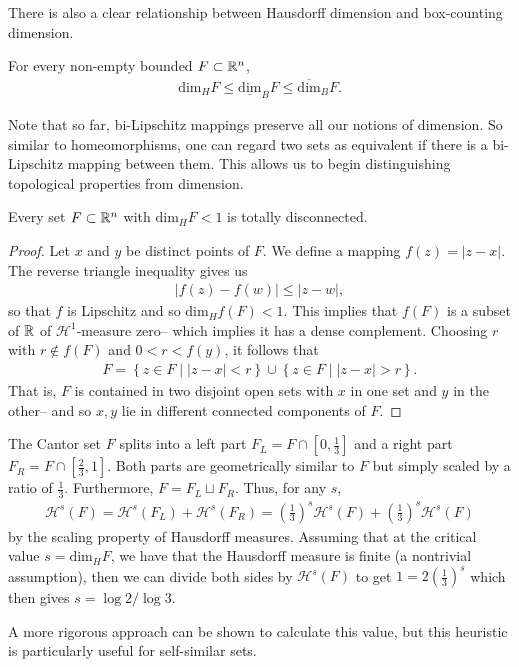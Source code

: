\documentclass{memoir}
\begin{document}
There is also a clear relationship between Hausdorff dimension and box-counting dimension.
\begin{prop}
	For every non-empty bounded \(F\subset \mathbb{R}^{n}\),
	\begin{align*}
		\textrm{dim}_H F \leq \underline{ \textrm{dim}}_B F \leq \overline{ \textrm{dim}}_B F.
	\end{align*}
\end{prop}
Note that so far, bi-Lipschitz mappings preserve all our notions of dimension. So similar to homeomorphisms, one can regard two sets as equivalent if there is a bi-Lipschitz mapping between them. This allows us to begin distinguishing topological properties from dimension.
\begin{prop}
	Every set \(F\subset \mathbb{R}^{n}\) with \( \textrm{dim}_H F < 1\) is totally disconnected.
\end{prop}
\begin{proof}
	Let \(x\) and \(y\) be distinct points of \(F\). We define a mapping \(f(z) = \left| z-x \right| \). The reverse triangle inequality gives us
	\begin{align*}
		\left| f(z) - f(w) \right| \leq \left| z-w \right| ,
	\end{align*}
	so that \(f\) is Lipschitz and so \( \textrm{dim}_H f(F) < 1\). This implies that \(f(F)\) is a subset of \(\mathbb{R}\) of \(\mathcal{H}^{1}\)-measure zero-- which implies it has a dense complement. Choosing \(r\) with \(r \not\in f(F)\) and \(0<r<f(y)\), it follows that
	\begin{align*}
		F = \left\{z \in F \mid \left| z-x \right| <r \right\} \cup \left\{z \in F \mid \left| z-x \right| >r \right\} .
	\end{align*}
	That is, \(F\) is contained in two disjoint open sets with \(x\) in one set and \(y\) in the other-- and so \(x,y\) lie in different connected components of \(F\).
\end{proof}


\begin{exmp}
	The Cantor set \(F\) splits into a left part \(F_L=F \cap \left[ 0,\frac{1}{3} \right] \) and a right part \(F_R = F \cap \left[ \frac{2}{3},1 \right] \). Both parts are geometrically similar to \(F\) but simply scaled by a ratio of \(\frac{1}{3}\). Furthermore, \(F = F_L \sqcup F_R\). Thus, for any \(s\),
	\begin{align*}
		\mathcal{H}^{s}(F) = \mathcal{H}^{s}(F_L) + \mathcal{H}^{s}(F_R) = \left( \frac{1}{3} \right)^{s}\mathcal{H}^{s}(F) + \left( \frac{1}{3} \right)^{s}\mathcal{H}^{s}(F)
	\end{align*}
	by the scaling property of Hausdorff measures. Assuming that at the critical value \(s = \textrm{dim}_H F\), we have that the Hausdorff measure is finite (a nontrivial assumption), then we can divide both sides by \(\mathcal{H}^{s}(F)\) to get \(1 = 2\left( \frac{1}{3} \right)^{s}\) which then gives \(s = \log 2 / \log 3\).
\end{exmp}
A more rigorous approach can be shown to calculate this value, but this heuristic is particularly useful for self-similar sets.
\end{document}
